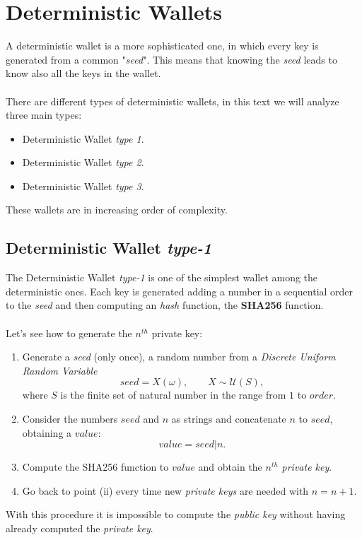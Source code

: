 \section{Deterministic Wallets}
A deterministic wallet is a more sophisticated one, in which every key is generated from a common "\textit{seed}". This means that knowing the \textit{seed} leads to know also all the keys in the wallet.\\ \\
There are different types of deterministic wallets, in this text we will analyze three main types:
\begin{itemize}
	\item Deterministic Wallet \textit{type 1}.
	\item Deterministic Wallet \textit{type 2}.
	\item Deterministic Wallet \textit{type 3}.
\end{itemize}
These wallets are in increasing order of complexity.

\subsection{Deterministic Wallet \textit{type-1}}
The Deterministic Wallet \textit{type-1} is one of the simplest wallet among the deterministic ones. Each key is generated adding a number in a sequential order to the \textit{seed} and then computing an \textit{hash} function, the \textbf{SHA256} function.
\\ \\
Let's see how to generate the $n^{th}$ private key:

\begin{enumerate}[label=(\roman*)]
	\item Generate a \textit{seed} (only once), a random number from a \textit{Discrete Uniform Random Variable}
	\begin{equation*}
	seed=X(\omega), \qquad X\sim \mathcal{U}(S),
	\end{equation*}
	where $S$ is the finite set of natural number in the range from $1$ to $order$.
	\item Consider the numbers $seed$ and $n$ as strings and concatenate $n$ to $seed$, obtaining a $value$:
	\begin{equation*}
	value=seed|n.
	\end{equation*}
	\item Compute the SHA256 function to $value$ and obtain the $n^{th}$ \textit{private key}.
	\item Go back to point (ii) every time new \textit{private keys} are needed with $n=n+1$. 
\end{enumerate}
With this procedure it is impossible to compute the \textit{public key} without having already computed the \textit{private key}.

